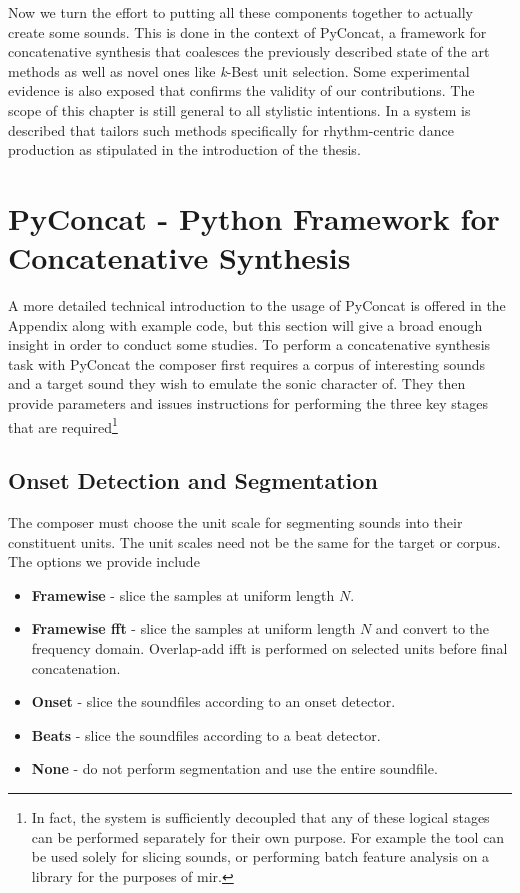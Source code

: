 {{{{{{{{Now we turn the effort to putting all these components together to actually create some sounds. This is done in the context of PyConcat, a framework for concatenative synthesis that coalesces the previously described state of the art methods as well as novel ones like \textit{k}-Best unit selection. Some experimental evidence is also exposed that confirms the validity of our contributions. The scope of this chapter is still general to all stylistic intentions. In  a system is described that tailors such methods specifically for rhythm-centric dance production as stipulated in the introduction of the thesis.
 
\section{PyConcat - Python Framework for Concatenative Synthesis}

A more detailed technical introduction to the usage of PyConcat is offered in the Appendix along with example code, but this section will give a broad enough insight in order to conduct some studies. To perform a concatenative synthesis task with PyConcat the composer first requires a corpus of interesting sounds and a target sound they wish to emulate the sonic character of. They then provide parameters and issues instructions for performing the three key stages that are required\footnote{In fact, the system is sufficiently decoupled that any of these logical stages can be performed separately for their own purpose. For example the tool can be used solely for slicing sounds, or performing batch feature analysis on a library for the purposes of \acrshort{mir}.}

\subsection{Onset Detection and Segmentation}

The composer must choose the unit scale for segmenting sounds into their constituent units. The unit scales need not be the same for the target or corpus. The options we provide include

\begin{itemize}
  \item \textbf{Framewise} - slice the samples at uniform length $N$.
  \item \textbf{Framewise \acrshort{fft}} - slice the samples at uniform length $N$ and convert to the frequency domain. Overlap-add \acrshort{ifft} is performed on selected units before final concatenation.
  \item \textbf{Onset} - slice the soundfiles according to an onset detector.
  \item \textbf{Beats} - slice the soundfiles according to a beat detector.
  \item \textbf{None} - do not perform segmentation and use the entire soundfile. 
\end{itemize}

}}}}}}}}

